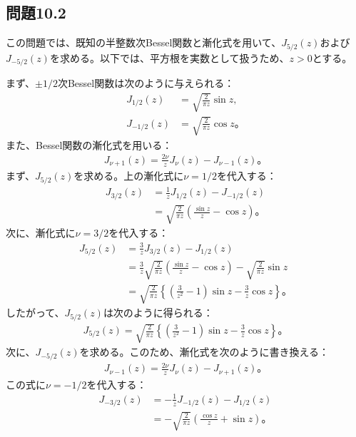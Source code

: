 \documentclass[platex,dvipdfmx,a4paper]{jsarticle}
\begin{document}
  \subsection*{問題10.2}

  この問題では、既知の半整数次Bessel関数と漸化式を用いて、$J_{5/2}(z)$および$J_{-5/2}(z)$を求める。以下では、平方根を実数として扱うため、$z>0$とする。
  
  まず、$\pm 1/2$次Bessel関数は次のように与えられる：
  \begin{align*}
    J_{1/2}(z)
    &=\sqrt{\frac{2}{\pi z}}\sin z,\\
    J_{-1/2}(z)
    &=\sqrt{\frac{2}{\pi z}}\cos z。
  \end{align*}
  また、Bessel関数の漸化式を用いる：
  \begin{align*}
    J_{\nu+1}(z)=\frac{2\nu}{z}J_\nu(z)-J_{\nu-1}(z)。
  \end{align*}
  まず、$J_{5/2}(z)$を求める。上の漸化式に$\nu=1/2$を代入する：
  \begin{align*}
    J_{3/2}(z)
    &=\frac{1}{z}J_{1/2}(z)-J_{-1/2}(z)\\
    &=\sqrt{\frac{2}{\pi z}}
    \left(\frac{\sin z}{z}-\cos z\right)。
  \end{align*}
  次に、漸化式に$\nu=3/2$を代入する：
  \begin{align*}
    J_{5/2}(z)
    &=\frac{3}{z}J_{3/2}(z)-J_{1/2}(z)\\
    &=\frac{3}{z}\sqrt{\frac{2}{\pi z}}
    \left(\frac{\sin z}{z}-\cos z\right)
    -\sqrt{\frac{2}{\pi z}}\sin z\\
    &=\sqrt{\frac{2}{\pi z}}
    \left\{\left(\frac{3}{z^2}-1\right)\sin z-\frac{3}{z}\cos z\right\}。
  \end{align*}
  したがって、$J_{5/2}(z)$は次のように得られる：
  \begin{align*}
    J_{5/2}(z)
    =\sqrt{\frac{2}{\pi z}}
    \left\{\left(\frac{3}{z^2}-1\right)\sin z-\frac{3}{z}\cos z\right\}。
  \end{align*}
  次に、$J_{-5/2}(z)$を求める。このため、漸化式を次のように書き換える：
  \begin{align*}
    J_{\nu-1}(z)=\frac{2\nu}{z}J_\nu(z)-J_{\nu+1}(z)。
  \end{align*}
  この式に$\nu=-1/2$を代入する：
  \begin{align*}
    J_{-3/2}(z)
    &=-\frac{1}{z}J_{-1/2}(z)-J_{1/2}(z)\\
    &=-\sqrt{\frac{2}{\pi z}}
    \left(\frac{\cos z}{z}+\sin z\right)。
  \end{align*}
\end{document}
